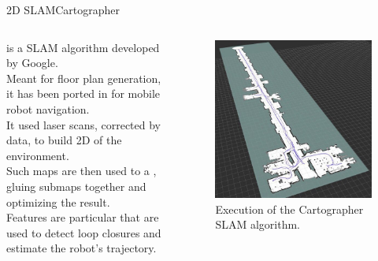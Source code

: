 \begin{frame}{2D SLAM}{Cartographer}
  \begin{columns}
     is a  SLAM algorithm developed by Google.\\
    \medskip
    Meant for  floor plan generation, it has been ported in  for mobile robot navigation.\\
    \medskip
    It used  laser scans, corrected by  data, to build 2D  of the  environment.\\
    \medskip
    Such maps are then used to  a , gluing submaps together and optimizing the result.\\
    \medskip
    Features are particular  that are used to detect loop closures and estimate the robot's trajectory.

    \begin{figure}
      \centering
      \includegraphics[width=.77\textwidth]{cartographer}
      \caption{Execution of the Cartographer SLAM algorithm.}
      \label{fig:cartographer}
    \end{figure}
  \end{columns}
\end{frame}


